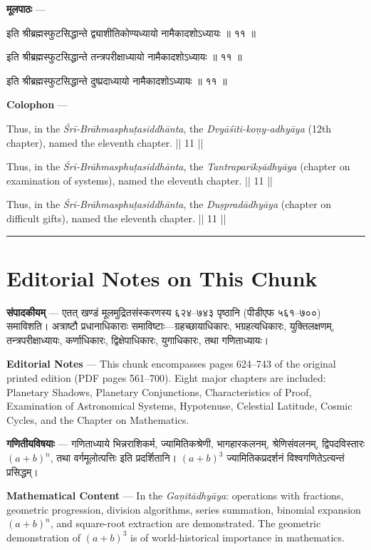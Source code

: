 \documentclass[11pt,a4paper]{article}
\newcommand{\skt}[1]{{\devanagarifont\color{sktcolor} #1}}
\newenvironment{bilingual}{%
  \par\noindent
  \begin{minipage}[t]{0.47\textwidth}%
}{%
  \par\end{minipage}%
}
\newcommand{\rightcol}{%
  \par\end{minipage}%
  \hfill
  \begin{minipage}[t]{0.47\textwidth}%
}
\begin{document}
\begin{bilingual}
\textbf{मूलपाठः} ---

\skt{इति श्रीब्रह्मस्फुटसिद्धान्ते द्व्याशीतिकोण्यध्यायो नामैकादशोऽध्यायः ॥ ११ ॥}

\skt{इति श्रीब्रह्मस्फुटसिद्धान्ते तन्त्रपरीक्षाध्यायो नामैकादशोऽध्यायः ॥ ११ ॥}

\skt{इति श्रीब्रह्मस्फुटसिद्धान्ते दुष्प्रदाध्यायो नामैकादशोऽध्यायः ॥ ११ ॥}
\rightcol
\textbf{Colophon} ---

Thus, in the \textit{Śrī-Brāhmasphuṭasiddhānta}, the \textit{Dvyāśīti-koṇy-adhyāya} (12th chapter), named the eleventh chapter. || 11 ||

Thus, in the \textit{Śrī-Brāhmasphuṭasiddhānta}, the \textit{Tantraparīkṣādhyāya} (chapter on examination of systems), named the eleventh chapter. || 11 ||

Thus, in the \textit{Śrī-Brāhmasphuṭasiddhānta}, the \textit{Duṣpradādhyāya} (chapter on difficult gifts), named the eleventh chapter. || 11 ||
\end{bilingual}

\medskip
\noindent\rule{\textwidth}{0.4pt}

\section*{Editorial Notes on This Chunk}

\begin{bilingual}
\textbf{संपादकीयम्} --- एतत् खण्डं मूलमुद्रितसंस्करणस्य ६२४--७४३ पृष्ठानि (पीडीएफ ५६१--७००) समाविशति। अत्राष्टौ प्रधानाधिकाराः समाविष्टाः---ग्रहच्छायाधिकारः, भग्रहत्यधिकारः, युक्तिलक्षणम्, तन्त्रपरीक्षाध्यायः, कर्णाधिकारः, द्विक्षेपाधिकारः, युगाधिकारः, तथा गणिताध्यायः।
\rightcol
\textbf{Editorial Notes} --- This chunk encompasses pages 624--743 of the original printed edition (PDF pages 561--700). Eight major chapters are included: Planetary Shadows, Planetary Conjunctions, Characteristics of Proof, Examination of Astronomical Systems, Hypotenuse, Celestial Latitude, Cosmic Cycles, and the Chapter on Mathematics.
\end{bilingual}

\medskip

\begin{bilingual}
\textbf{गणितीयविषयाः} --- गणिताध्याये भिन्नराशिकर्म, ज्यामितिकश्रेणी, भागहारकलनम्, श्रेणिसंवलनम्, द्विपदविस्तारः $(a+b)^n$, तथा वर्गमूलोत्पत्तिः इति प्रदर्शितानि। $(a+b)^3$ ज्यामितिकप्रदर्शनं विश्वगणितेऽत्यन्तं प्रसिद्धम्।
\rightcol
\textbf{Mathematical Content} --- In the \textit{Gaṇitādhyāya}: operations with fractions, geometric progression, division algorithms, series summation, binomial expansion $(a+b)^n$, and square-root extraction are demonstrated. The geometric demonstration of $(a+b)^3$ is of world-historical importance in mathematics.
\end{bilingual}
\end{document}
